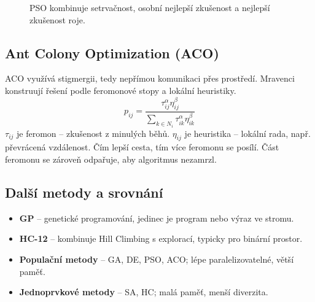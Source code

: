 \begin{figure}[H]
    \centering
    \caption{PSO kombinuje setrvačnost, osobní nejlepší zkušenost a nejlepší zkušenost roje.}
\end{figure}

\subsection*{Ant Colony Optimization (ACO)}
ACO využívá stigmergii, tedy nepřímou komunikaci přes prostředí. Mravenci
konstruují řešení podle feromonové stopy a lokální heuristiky.
\begin{equation}
    p_{ij}=\frac{\tau_{ij}^{\alpha}\eta_{ij}^{\beta}}{\sum_{k \in N_i}\tau_{ik}^{\alpha}\eta_{ik}^{\beta}}
\end{equation}
\(\tau_{ij}\) je feromon -- zkušenost z minulých běhů. \(\eta_{ij}\) je heuristika -- lokální rada, např. převrácená vzdálenost. Čím lepší cesta, tím více feromonu se posílí. Část feromonu se zároveň odpařuje, aby algoritmus nezamrzl.

\subsection*{Další metody a srovnání}
\begin{itemize}
    \item \textbf{GP} -- genetické programování, jedinec je program nebo výraz ve stromu.
    \item \textbf{HC-12} -- kombinuje Hill Climbing s explorací, typicky pro binární prostor.
    \item \textbf{Populační metody} -- GA, DE, PSO, ACO; lépe paralelizovatelné, větší paměť.
    \item \textbf{Jednoprvkové metody} -- SA, HC; malá paměť, menší diverzita.
\end{itemize}


